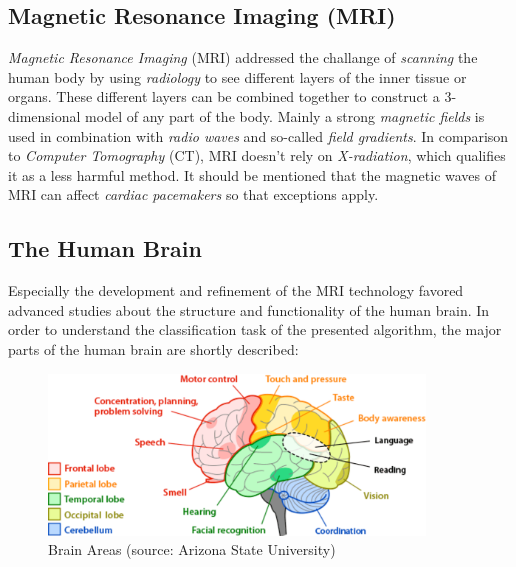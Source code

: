 \documentclass[twoside,11pt]{article}
\begin{document}
\subsection{Magnetic Resonance Imaging (MRI)}
\textit{Magnetic Resonance Imaging} (MRI) addressed the challange of 
\textit{scanning} the human body by using \textit{radiology}  to see different layers of the inner tissue or organs. These different layers can be combined together to construct a 3-dimensional model of any part of the body. Mainly a strong  \textit{magnetic fields} is used in combination with \textit{radio waves}  and so-called \textit{field gradients}.
In comparison to \textit{Computer Tomography} (CT), MRI doesn't rely on \textit{X-radiation}, which qualifies it as a less harmful method. It should be mentioned that the magnetic waves of MRI can affect \textit{cardiac pacemakers} so that exceptions apply. \citep{edelman1993magnetic}

\subsection{The Human Brain}
Especially the development and refinement of the MRI technology favored advanced studies about the structure and functionality of the human brain. In order to understand the classification task of the presented algorithm, the major parts of the human brain are shortly described:
\begin{figure}{\textwidth}
	\centering
	\includegraphics[width=10cm]{brain-areas}
	\caption{Brain Areas (source: Arizona State University)}
\end{figure}%
\end{document}
